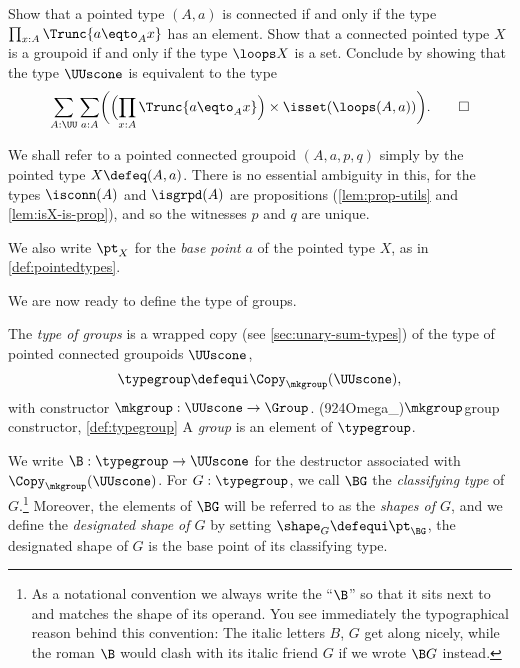 \begin{xca}\label{xca:defgroup}
  Show that a pointed type $(A,a)$ is connected if and only if the type $\prod_{x:A}\Trunc{a \eqto_A x}$ has an element.
  Show that a connected pointed type $X$ is a groupoid if and only if the type $\loops X$ is a set.
  Conclude by showing that the type $\UUscone$ is equivalent to the type
  \[
    \sum_{A:\UU} \sum_{a:A} \biggl( \Bigl( \prod_{x:A}\Trunc{a \eqto_A x} \Bigr)
      \times \isset( \loops (A,a) ) \biggr).\qedhere
  \]
\end{xca}

\begin{remark}
  We shall refer to a pointed connected groupoid $(A,a,p,q)$ simply
  by the pointed type $X \defeq (A,a)$.
  There is no essential ambiguity in this, for
  the types $\isconn(A)$ and $\isgrpd(A)$ are propositions (\cref{lem:prop-utils} and \cref{lem:isX-is-prop}),
  and so the witnesses $p$ and $q$ are unique.

  We also write $\pt_X$ for the \emph{base point} $a$ of the pointed type $X$, as in \cref{def:pointedtypes}.
\end{remark}

We are now ready to define the type of groups.

\begin{definition}\label{def:typegroup}
  The \emph{type of groups} is a wrapped copy (see \cref{sec:unary-sum-types})
  of the type of pointed connected groupoids $\UUscone$,
  \[
    \typegroup \defequi \Copy_{\mkgroup}(\UUscone),
  \]
  with constructor $\mkgroup : \UUscone \to \Group$.%
  \glossary(924Omega_){$\protect\mkgroup$}{group constructor, \cref{def:typegroup}}
  A \emph{group} is an element of $\typegroup$.
\end{definition}

\begin{definition}\label{def:classifying-type}
  We write $\B : \typegroup \to \UUscone$ for the
  destructor associated with $\Copy_{\mkgroup}(\UUscone)$.
  For $G : \typegroup$,
  we call $\BG$ the \emph{classifying type} of $G$.\footnote{%
    As a notational convention we always write the ``$\B$''
    so that it sits next to and matches the shape
    of its operand.
    You see immediately the typographical reason behind this convention:
    The italic letters $B$, $G$ get along nicely,
    while the roman $\B$ would clash with its italic friend $G$
    if we wrote $\B G$ instead.}
  Moreover, the elements of $\BG$ will be referred to as the \emph{shapes of $G$},
  and we define the \emph{designated shape of $G$} by setting
  $\shape_G\defequi \pt_{\BG}$,
  \ie the designated shape of $G$ is the base point of its
  classifying type.
\end{definition}

